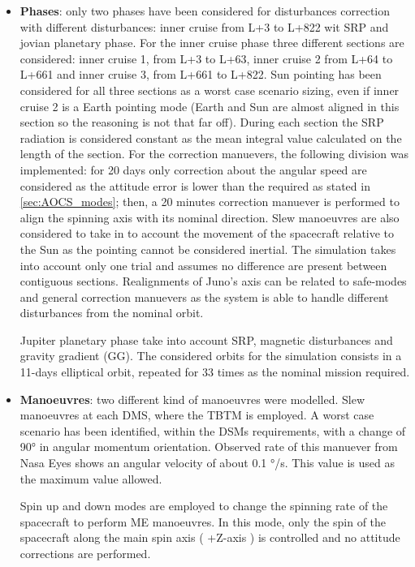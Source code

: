 \begin{itemize}
    \item \textbf{Phases}: only two phases have been considered for disturbances correction with different disturbances: inner cruise from L+3 to L+822 wit SRP and jovian planetary phase. For the inner cruise phase three different sections are considered: inner cruise 1, from L+3 to L+63, inner cruise 2 from L+64 to L+661 and inner cruise 3, from L+661 to L+822. Sun pointing has been considered for all three sections as a worst case scenario sizing, even if inner cruise 2 is a Earth pointing mode (Earth and Sun are almost aligned in this section so the reasoning is not that far off). During each section the SRP radiation is considered constant as the mean integral value calculated on the length of the section. For the correction manuevers, the following division was implemented: for 20 days only correction about the angular speed are considered as the attitude error is lower than the required as stated in \autoref{sec:AOCS_modes}; then, a 20 minutes correction manuever is performed to align the spinning axis with its nominal direction. Slew manoeuvres are also considered to take in to account the movement of the spacecraft relative to the Sun as the pointing cannot be considered inertial. The simulation takes into account only one trial and assumes no difference are present between contiguous sections. Realignments of Juno's axis can be related to safe-modes and general correction manuevers as the system is able to handle different disturbances from the nominal orbit. 
    
    Jupiter planetary phase take into account SRP, magnetic disturbances and gravity gradient (GG). The considered orbits for the simulation consists in a 11-days elliptical orbit, repeated for 33 times as the nominal mission required. 

    \item \textbf{Manoeuvres}: two different kind of manoeuvres were modelled. Slew manoeuvres at each DMS, where the TBTM is employed. A worst case scenario has been identified, within the DSMs requirements, with a change of 90° in angular momentum orientation. Observed rate of this manuever from Nasa Eyes\cite{nasa_eyes} shows an angular velocity of about 0.1 °/s. This value is used as the maximum value allowed. 
    
    Spin up and down modes are employed to change the spinning rate of the spacecraft to perform ME manoeuvres. In this mode, only the spin of the spacecraft along the main spin axis ( +Z-axis ) is controlled and no attitude corrections are performed.      

\end{itemize}


